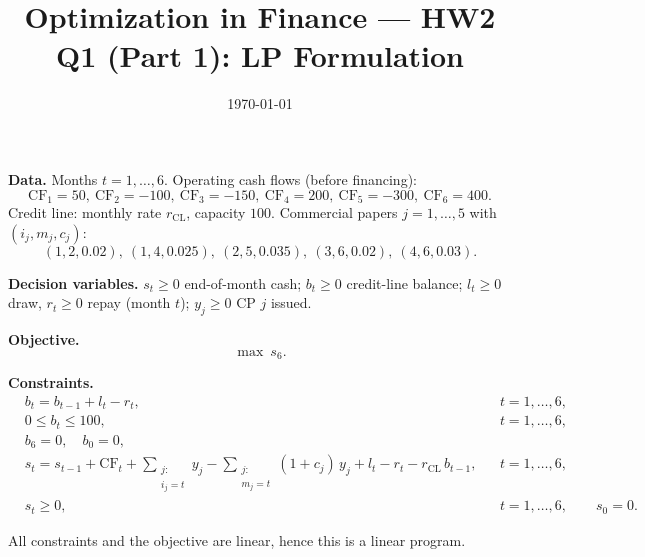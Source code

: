 \documentclass[11pt]{article}
\title{Optimization in Finance --- HW2 \\ \large Q1 (Part 1): LP Formulation}
\author{}
\date{\today}
\begin{document}
\maketitle

\noindent\textbf{Data.}\;
Months $t=1,\ldots,6$. Operating cash flows (before financing):
\[
\mathrm{CF}_1=50,\ \mathrm{CF}_2=-100,\ \mathrm{CF}_3=-150,\ \mathrm{CF}_4=200,\ \mathrm{CF}_5=-300,\ \mathrm{CF}_6=400.
\]
Credit line: monthly rate $r_{\mathrm{CL}}$, capacity $100$.
Commercial papers $j=1,\ldots,5$ with $(i_j,m_j,c_j)$:
\[
(1,2,0.02),\ (1,4,0.025),\ (2,5,0.035),\ (3,6,0.02),\ (4,6,0.03).
\]

\medskip
\noindent\textbf{Decision variables.}\;
$s_t\ge0$ end-of-month cash;\; $b_t\ge0$ credit-line balance;\; $l_t\ge0$ draw, $r_t\ge0$ repay (month $t$);\; $y_j\ge0$ CP $j$ issued.

\medskip
\noindent\textbf{Objective.}
\[
\max\ s_6.
\]

\noindent\textbf{Constraints.}
\begin{align}
& b_t=b_{t-1}+l_t-r_t, && t=1,\dots,6, \label{eq:bal}\\
& 0\le b_t\le 100, && t=1,\dots,6, \label{eq:cap}\\
& b_6=0,\quad b_0=0, \label{eq:term}\\[2pt]
& s_t = s_{t-1} + \mathrm{CF}_t
  + \sum_{\substack{j:\\ i_j=t}} y_j
  - \sum_{\substack{j:\\ m_j=t}} (1+c_j)\,y_j
  + l_t - r_t
  - r_{\mathrm{CL}}\,b_{t-1},
&& t=1,\dots,6, \label{eq:cash}\\
& s_t \ge 0, && t=1,\dots,6,\qquad s_0=0. \label{eq:nobank}
\end{align}

\vspace{-0.5em}
\noindent All constraints and the objective are linear, hence this is a linear program.
\end{document}
